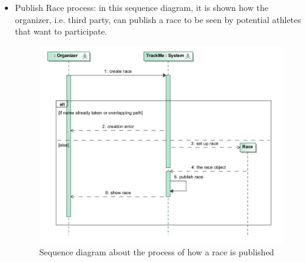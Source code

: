 \begin{itemize}
\item Publish Race process: in this sequence diagram, it is shown how the organizer, i.e. third party, can publish a race to be seen by potential athletes that want to participate.
\begin{figure}[H]
\includegraphics[width=\linewidth]{Images/racesequence}
\caption{Sequence diagram about the process of how a race is published}
\label{fig:sequencediagram3}
\end{figure}

\end{itemize}